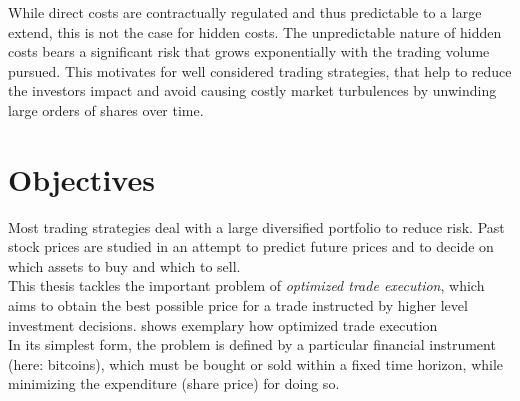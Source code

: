 While direct costs are contractually regulated and thus predictable to a large extend, this is not the case for hidden costs. The unpredictable nature of hidden costs bears a significant risk that grows exponentially with the trading volume pursued. This motivates for well considered trading strategies, that help to reduce the investors impact and avoid causing costly market turbulences by unwinding large orders of shares over time.



\section{Objectives}
\label{sec:objectives}
Most trading strategies deal with a large diversified portfolio to reduce risk. Past stock prices are studied in an attempt to predict future prices and to decide on which assets to buy and which to sell.\\

This thesis tackles the important problem of \emph{optimized trade execution}, which aims to obtain the best possible price for a trade instructed by higher level investment decisions.  shows exemplary how optimized trade execution \\



In its simplest form, the problem is defined by a particular financial instrument (here: bitcoins), which must be bought or sold within a fixed time horizon, while minimizing the expenditure (share price) for doing so.\\

